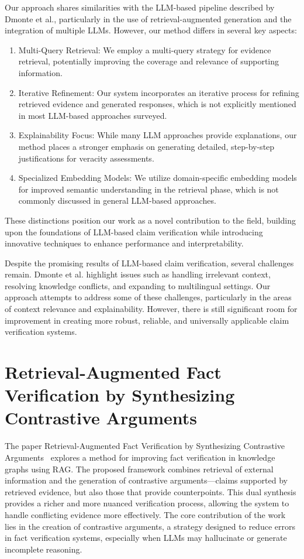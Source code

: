 Our approach shares similarities with the LLM-based pipeline described by Dmonte et al., particularly in the use of retrieval-augmented generation and the integration of multiple LLMs. However, our method differs in several key aspects:
\begin{enumerate}
    \item Multi-Query Retrieval: We employ a multi-query strategy for evidence retrieval, potentially improving the coverage and relevance of supporting information.
    \item Iterative Refinement: Our system incorporates an iterative process for refining retrieved evidence and generated responses, which is not explicitly mentioned in most LLM-based approaches surveyed.
    \item Explainability Focus: While many LLM approaches provide explanations, our method places a stronger emphasis on generating detailed, step-by-step justifications for veracity assessments.
    \item Specialized Embedding Models: We utilize domain-specific embedding models for improved semantic understanding in the retrieval phase, which is not commonly discussed in general LLM-based approaches.
\end{enumerate}

These distinctions position our work as a novel contribution to the field, building upon the foundations of LLM-based claim verification while introducing innovative techniques to enhance performance and interpretability.

Despite the promising results of LLM-based claim verification, several challenges remain.
Dmonte et al. highlight issues such as handling irrelevant context, resolving knowledge conflicts, and expanding to multilingual settings. Our approach attempts to address some of these challenges, particularly in the areas of context relevance and explainability. However, there is still significant room for improvement in creating more robust, reliable, and universally applicable claim verification systems.

\section{Retrieval-Augmented Fact Verification by Synthesizing Contrastive Arguments}\label{sec:retrieval-augmented-fact-verification}
The paper Retrieval-Augmented Fact Verification by Synthesizing Contrastive Arguments~\cite{yue2024retrievalaugmentedfactverification} explores a method for improving fact verification in knowledge graphs using RAG.
The proposed framework combines retrieval of external information and the generation of contrastive arguments—claims supported by retrieved evidence, but also those that provide counterpoints.
This dual synthesis provides a richer and more nuanced verification process, allowing the system to handle conflicting evidence more effectively.
The core contribution of the work lies in the creation of contrastive arguments, a strategy designed to reduce errors in fact verification systems, especially when LLMs may hallucinate or generate incomplete reasoning.

